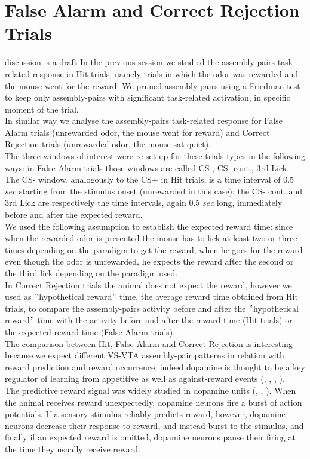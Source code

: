 \section{False Alarm and Correct Rejection Trials}
\label{sec:FalseAlCorrRej}
{\color{red} discussion is a draft}
In the previous session we studied the assembly-pairs task related response in Hit trials, namely trials in which the odor was rewarded and the mouse went for the reward. We pruned assembly-pairs using a Friedman test to keep only assembly-pairs with significant task-related activation, in specific moment of the trial.\\In similar way we analyse the assembly-pairs task-related response for False Alarm trials (unrewarded odor, the mouse went for reward) and Correct Rejection trials (unrewarded odor, the mouse sat quiet).\\The three windows of interest were re-set up for these trials types in the following ways: in False Alarm trials those windows are called CS-, CS- cont., 3rd Lick. The CS- window, analogously to the CS+ in Hit trials, is a time interval of 0.5 $sec$ starting from the stimulus onset (unrewarded in this case); the CS- cont. and 3rd Lick are respectively the time intervals, again 0.5 $sec$ long, immediately before and after the expected reward.\\We used the following assumption to establish the expected reward time: since when the rewarded odor is presented the mouse has to lick at least two or three times depending on the paradigm to get the reward, when he goes for the reward even though the odor is unrewarded, he expects the reward after the second or the third lick depending on the paradigm used.\\In Correct Rejection trials the animal does not expect the reward, however we used as $"$hypothetical reward$"$ time, the average reward time obtained from Hit trials, to compare the assembly-pairs activity before and after the $"$hypothetical reward$"$ time with the activity before and after the reward time (Hit trials) or the expected reward time (False Alarm trials).\\The comparison between Hit, False Alarm and Correct Rejection is interesting because we expect different VS-VTA assembly-pair patterns in relation with reward prediction and reward occurrence, indeed dopamine is thought to be a key regulator of learning from appetitive as well as against-reward events (\cite{Schultz1997}, \cite{Wenzel}, \cite{Fiorillo2013b}, \cite{Schultz2015}).\\The predictive reward signal was widely studied in dopamine units (\cite{Schultz1998}, \cite{Schultz2001}, \cite{Doya}). When the animal receives reward unexpectedly, dopamine neurons fire a burst of action potentials. If a sensory stimulus reliably predicts reward, however, dopamine neurons decrease their response to reward, and instead burst to the stimulus, and finally if an expected reward is omitted, dopamine neurons pause their firing at the time they usually receive reward.\\
